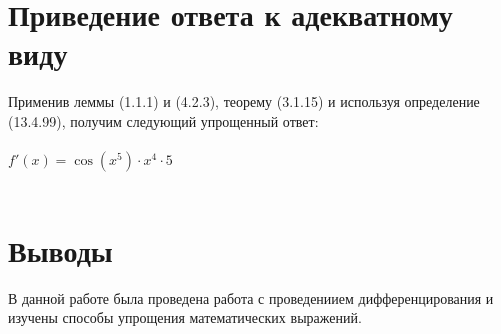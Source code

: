 \documentclass[a4paper,12pt]{article} %
\begin{document}
\section{Приведение ответа к адекватному виду}

Применив леммы (1.1.1) и (4.2.3), теорему (3.1.15) и используя определение (13.4.99), получим следующий упрощенный ответ:\\ 
 \hspace{1cm}\\ 
 

$ f'(x) =  \cos\left({x} ^ {{5}} \right) \cdot {x} ^ {{4}} \cdot {5} $\\ 
 \hspace{1cm}\\ 
 

\section{Выводы}

В данной работе была проведена работа с проведениием дифференцирования и изучены способы упрощения математических выражений.
\end{document}
